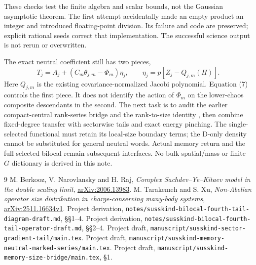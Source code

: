 \documentclass[11pt]{article}
\begin{document}
These checks test the finite algebra and scalar bounds, not the Gaussian
asymptotic theorem. The first attempt accidentally made an empty product
an integer and introduced floating-point division. Its failure and code
are preserved; explicit rational seeds correct that implementation.
The successful science output is not rerun or overwritten.

The exact neutral coefficient still has two pieces,
\[
 T_j=A_j+(C_m\theta_{j,m}-\Phi_m)\eta_j,\qquad
 \eta_j=p[Z_j-Q_{j,m}(H)] .
\]
Here $Q_{j,m}$ is the existing covariance-normalized Jacobi polynomial.
Equation (7) controls the first piece. It does not identify the action
of $\Phi_m$ on the lower-chaos composite descendants in the second.
The next task is to audit the earlier compact-central rank-series
bridge \cite{neutral} and the rank-to-size identity \cite{size}, then
combine fixed-degree transfer with sectorwise tails and exact energy
pinching. The single-selected functional must retain its local-size
boundary terms; the D-only density cannot be substituted for general
neutral words. Actual memory return and the full selected bilocal remain
subsequent interfaces. No bulk spatial/mass or finite-$G$ dictionary is
derived in this note.

\begin{thebibliography}{9}\small
{} M. Berkooz, V. Narovlansky and H. Raj,
\emph{Complex Sachdev--Ye--Kitaev model in the double scaling limit},
\href{https://arxiv.org/abs/2006.13983}{arXiv:2006.13983}.
 M. Tarakemeh and S. Xu,
\emph{Non-Abelian operator size distribution in charge-conserving
many-body systems}, \href{https://arxiv.org/abs/2511.16634v1}{arXiv:2511.16634v1}.
 Project derivation,
\nolinkurl{notes/susskind-bilocal-fourth-tail-diagram-draft.md}, §§1--4.
 Project derivation,
\nolinkurl{notes/susskind-bilocal-fourth-tail-operator-draft.md}, §§2--4.
 Project draft,
\nolinkurl{manuscript/susskind-sector-gradient-tail/main.tex}.
 Project draft,
\nolinkurl{manuscript/susskind-memory-neutral-marked-series/main.tex}.
 Project draft,
\nolinkurl{manuscript/susskind-memory-size-bridge/main.tex}, §1.
\end{thebibliography}
\end{document}
